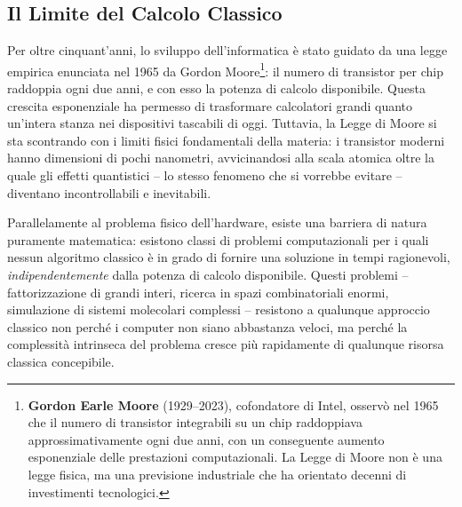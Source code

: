 \begin{onehalfspace}

\section{Il Limite del Calcolo Classico}

Per oltre cinquant'anni, lo sviluppo dell'informatica è stato guidato da una legge empirica enunciata nel 1965 da Gordon Moore\footnote{\textbf{Gordon Earle Moore} (1929--2023), cofondatore di Intel, osservò nel 1965 che il numero di transistor integrabili su un chip raddoppiava approssimativamente ogni due anni, con un conseguente aumento esponenziale delle prestazioni computazionali. La Legge di Moore non è una legge fisica, ma una previsione industriale che ha orientato decenni di investimenti tecnologici.}: il numero di transistor per chip raddoppia ogni due anni, e con esso la potenza di calcolo disponibile. Questa crescita esponenziale ha permesso di trasformare calcolatori grandi quanto un'intera stanza nei dispositivi tascabili di oggi. Tuttavia, la Legge di Moore si sta scontrando con i limiti fisici fondamentali della materia: i transistor moderni hanno dimensioni di pochi nanometri, avvicinandosi alla scala atomica oltre la quale gli effetti quantistici -- lo stesso fenomeno che si vorrebbe evitare -- diventano incontrollabili e inevitabili.

Parallelamente al problema fisico dell'hardware, esiste una barriera di natura puramente matematica: esistono classi di problemi computazionali per i quali nessun algoritmo classico è in grado di fornire una soluzione in tempi ragionevoli, \textit{indipendentemente} dalla potenza di calcolo disponibile. Questi problemi -- fattorizzazione di grandi interi, ricerca in spazi combinatoriali enormi, simulazione di sistemi molecolari complessi -- resistono a qualunque approccio classico non perché i computer non siano abbastanza veloci, ma perché la complessità intrinseca del problema cresce più rapidamente di qualunque risorsa classica concepibile.


\end{onehalfspace}
